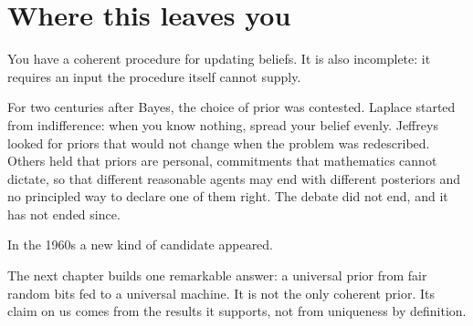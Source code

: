 \section*{Where this leaves you}

You have a coherent procedure for updating beliefs. It is also incomplete: it requires an input the procedure itself cannot supply.

For two centuries after Bayes, the choice of prior was contested. Laplace started from indifference: when you know nothing, spread your belief evenly. Jeffreys looked for priors that would not change when the problem was redescribed. Others held that priors are personal, commitments that mathematics cannot dictate, so that different reasonable agents may end with different posteriors and no principled way to declare one of them right. The debate did not end, and it has not ended since.

In the 1960s a new kind of candidate appeared.

The next chapter builds one remarkable answer: a universal prior from fair random bits fed to a universal machine. It is not the only coherent prior. Its claim on us comes from the results it supports, not from uniqueness by definition.
